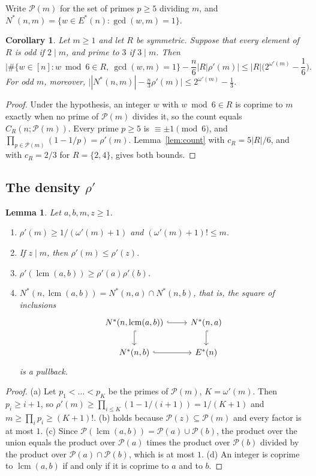 \documentclass[11pt,a4paper]{article}
\newtheorem{lemma}[theorem]{Lemma}
\newtheorem{corollary}[theorem]{Corollary}
\theoremstyle{definition}
\theoremstyle{remark}
\DeclareMathOperator{\lcm}{lcm}
\newcommand{\Es}{E^{*}}
\begin{document}
Write $\mathcal{P}(m)$ for the set of primes $p\ge5$ dividing $m$, and
$N^*(n,m)=\{w\in\Es(n):\gcd(w,m)=1\}$.

\begin{corollary}\label{cor:count}
Let $m\ge1$ and let $R$ be symmetric. Suppose that every element of $R$ is odd if $2\mid m$, and
prime to $3$ if $3\mid m$. Then
\[
  \Big|\#\{w\in[n]:w\bmod6\in R,\ \gcd(w,m)=1\}-\frac n6|R|\rho'(m)\Big|\le|R|\Big(2^{\omega'(m)}-
  \frac16\Big).
\]
For odd $m$, moreover, $\big||N^*(n,m)|-\tfrac n3\rho'(m)\big|\le 2^{\omega'(m)}-\tfrac13$.
\end{corollary}

\begin{proof}
Under the hypothesis, an integer $w$ with $w\bmod 6\in R$ is coprime to $m$ exactly when no prime of
$\mathcal{P}(m)$ divides it, so the count equals $C_R(n;\mathcal{P}(m))$. Every prime $p\ge5$ is
$\equiv\pm1\pmod6$, and $\prod_{p\in\mathcal{P}(m)}(1-1/p)=\rho'(m)$. Lemma~\ref{lem:count} with
$c_R=5|R|/6$, and with $c_R=2/3$ for $R=\{2,4\}$, gives both bounds.
\end{proof}

\subsection{\texorpdfstring{The density $\rho'$}{The density rho'}}

\begin{lemma}\label{lem:rho}
Let $a,b,m,z\ge1$.
\begin{enumerate}[label=(\alph*), nosep]
\item $\rho'(m)\ge1/(\omega'(m)+1)$ and $(\omega'(m)+1)!\le m$.
\item If $z\mid m$, then $\rho'(m)\le\rho'(z)$.
\item $\rho'(\lcm(a,b))\ge\rho'(a)\rho'(b)$.
\item $N^*(n,\lcm(a,b))=N^*(n,a)\cap N^*(n,b)$, that is, the square of inclusions
\begin{equation}\label{cd:pullback}
\begin{tikzcd}
  N^*(n,\lcm(a,b)) \arrow[r, hook] \arrow[d, hook] & N^*(n,a) \arrow[d, hook] \\
  N^*(n,b) \arrow[r, hook] & \Es(n)
\end{tikzcd}
\end{equation}
is a pullback.
\end{enumerate}
\end{lemma}

\begin{proof}
(a) Let $p_1<\dots<p_K$ be the primes of $\mathcal{P}(m)$, $K=\omega'(m)$. Then $p_i\ge i+1$, so
$\rho'(m)\ge\prod_{i\le K}(1-1/(i+1))=1/(K+1)$ and $m\ge\prod_i p_i\ge(K+1)!$. (b) holds because
$\mathcal{P}(z)\subseteq\mathcal{P}(m)$ and every factor is at most $1$. (c) Since
$\mathcal{P}(\lcm(a,b))=\mathcal{P}(a)\cup\mathcal{P}(b)$, the product over the union equals the
product over $\mathcal{P}(a)$ times the product over $\mathcal{P}(b)$ divided by the product over
$\mathcal{P}(a)\cap\mathcal{P}(b)$, which is at most $1$. (d) An integer is coprime to $\lcm(a,b)$ if
and only if it is coprime to $a$ and to $b$.
\end{proof}
\end{document}
